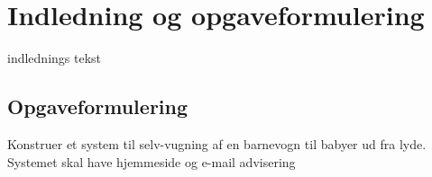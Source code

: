 \chapter{Indledning og opgaveformulering}

indlednings tekst

\section*{Opgaveformulering}

Konstruer et system til selv-vugning af en barnevogn til babyer ud fra lyde. Systemet skal have hjemmeside og e-mail advisering